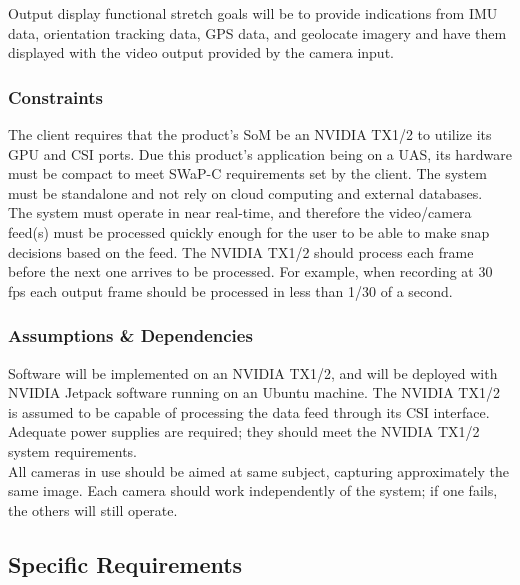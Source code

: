 \documentclass[letterpaper,10pt,serif,draftclsnofoot,onecolumn,compsoc,titlepage]{IEEEtran}
\begin{document}
Output display functional stretch goals will be to provide indications from IMU data, 
orientation tracking data, GPS data, and geolocate imagery and have them displayed 
with the video output provided by the camera input. \\

\subsubsection{Constraints}

The client requires that the product's SoM be an NVIDIA TX1/2 to utilize its GPU 
and CSI ports. Due this product's application being on a UAS, its hardware must be 
compact to meet SWaP-C requirements set by the client. The system must be standalone 
and not rely on cloud computing and external databases. \\

The system must operate in near real-time, and therefore the video/camera feed(s) must be 
processed quickly enough for the user to be able to make snap decisions based on the feed. The 
NVIDIA TX1/2 should process each frame before the next one arrives to be processed. 
For example, when recording at 30 fps each output frame should be processed in 
less than 1/30 of a second.\\

\subsubsection{Assumptions \& Dependencies}

Software will be implemented on an NVIDIA TX1/2, and will be deployed with NVIDIA 
Jetpack software running on an Ubuntu machine. The NVIDIA TX1/2 is assumed to be 
capable of processing the data feed through its CSI interface. \\

Adequate power supplies are required; they should meet the NVIDIA TX1/2 system 
requirements. \\

All cameras in use should be aimed at same subject, capturing approximately the same 
image. Each camera should work independently of the system; if one fails, the others 
will still operate.\\

\subsection{Specific Requirements}
\end{document}
